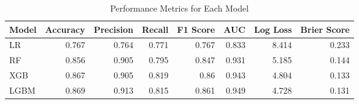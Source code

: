 \begin{table}[H]\centering
\caption{Performance Metrics for Each Model}
\label{Table 3 :performance_metrics}
\begin{tabular}{lrrrrrrr}
\toprule
Model & Accuracy & Precision & Recall & F1 Score & AUC & Log Loss & Brier Score \\
\midrule
LR & 0.767 & 0.764 & 0.771 & 0.767 & 0.833 & 8.414 & 0.233 \\
RF & 0.856 & 0.905 & 0.795 & 0.847 & 0.931 & 5.185 & 0.144 \\
XGB & 0.867 & 0.905 & 0.819 & 0.86 & 0.943 & 4.804 & 0.133 \\
LGBM & 0.869 & 0.913 & 0.815 & 0.861 & 0.949 & 4.728 & 0.131 \\
\bottomrule
\end{tabular}
\end{table}
